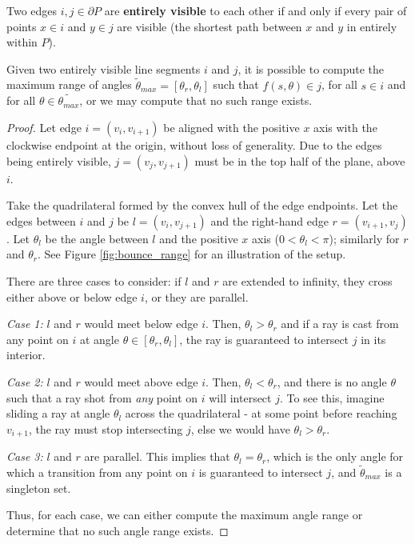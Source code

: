 \documentclass[]{svproc}  %
\begin{document}
\begin{definition}
Two edges $i,j \in \partial P$ are \textbf{entirely visible} to each other if
and only if every pair of points $x \in i$ and $y \in j$ are visible (the
shortest path between $x$ and $y$ in entirely within $P$).
\end{definition}

\begin{proposition}
Given two entirely visible line segments $i$ and $j$, it is possible to compute
the maximum range of angles $\tilde{\theta}_{max} = [\theta_r, \theta_l]$ such
that $f(s, \theta) \in j$, for all $s \in i$ and for all
$\theta \in \tilde{\theta_{max}}$, or we may compute that no such range exists.
\end{proposition}

\begin{proof}

Let edge $i = (v_i, v_{i+1})$ be aligned with the positive $x$ axis with the clockwise
endpoint at the origin, without loss of generality. Due to the edges being
entirely visible, $j = (v_j, v_{j+1})$ must be in the top half of the plane, above $i$.

Take the quadrilateral formed by the convex hull of the edge endpoints.
Let the edges between $i$ and $j$ be $l = (v_i, v_{j+1})$ and the right-hand edge 
$r = (v_{i+1}, v_j)$. Let $\theta_{l}$ be
the angle between $l$ and the positive $x$ axis ($0 < \theta_l < \pi$); similarly
for $r$ and $\theta_r$. See Figure \ref{fig:bounce_range} for an illustration of
the setup. 

There are three cases to consider: if $l$ and $r$ are extended to infinity,
they cross either above or below edge $i$, or they are parallel.

\emph{Case 1:} $l$ and $r$ would meet below edge $i$. Then,
$\theta_l > \theta_r$ and if a ray is cast from any point on $i$ at angle
$\theta \in [\theta_r, \theta_l]$, the ray is guaranteed to intersect $j$ in its
interior.

\emph{Case 2:} $l$ and $r$ would meet above edge $i$. Then, $\theta_l <
\theta_r$, and there is no angle
$\theta$ such that a ray shot from \emph{any} point on $i$ will intersect $j$.
To see this, imagine sliding a ray at angle $\theta_l$ across the quadrilateral
- at some point before reaching $v_{i+1}$, the ray must stop intersecting $j$,
else we would have $\theta_l > \theta_r$.

\emph{Case 3:} $l$ and $r$ are parallel. This implies that $\theta_{l} =
\theta_{r}$, which is the only angle for which a transition from any
point on $i$ is guaranteed to intersect $j$, and $\tilde{\theta}_{max}$ is a
singleton set.

Thus, for each case, we can either compute the maximum angle range or determine
that no such angle range exists.
\end{proof}
\end{document}
